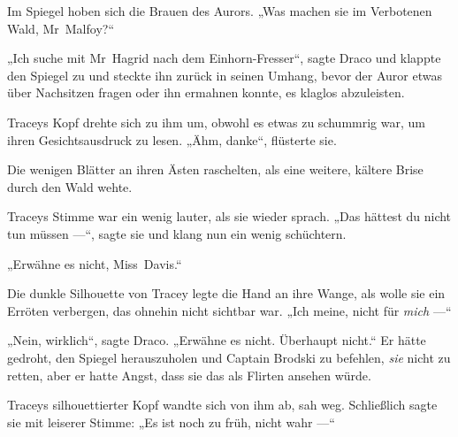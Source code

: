 Im Spiegel hoben sich die Brauen des Aurors.
„Was machen sie im Verbotenen Wald, Mr~Malfoy?“

„Ich suche mit Mr~Hagrid nach dem Einhorn-Fresser“, sagte Draco und klappte den Spiegel zu und steckte ihn zurück in seinen Umhang, bevor der Auror etwas über Nachsitzen fragen oder ihn ermahnen konnte, es klaglos abzuleisten.

Traceys Kopf drehte sich zu ihm um, obwohl es etwas zu schummrig war, um ihren Gesichtsausdruck zu lesen. „Ähm, danke“, flüsterte sie.

Die wenigen Blätter an ihren Ästen raschelten, als eine weitere, kältere Brise durch den Wald wehte.

Traceys Stimme war ein wenig lauter, als sie wieder sprach.
„Das hättest du nicht tun müssen —“, sagte sie und klang nun ein wenig schüchtern.

„Erwähne es nicht, Miss~Davis.“

Die dunkle Silhouette von Tracey legte die Hand an ihre Wange, als wolle sie ein Erröten verbergen, das ohnehin nicht sichtbar war.
„Ich meine, nicht für \emph{mich} —“

„Nein, wirklich“, sagte Draco.
„Erwähne es nicht. Überhaupt nicht.“
Er hätte gedroht, den Spiegel herauszuholen und Captain Brodski zu befehlen, \emph{sie} nicht zu retten, aber er hatte Angst, dass sie das als Flirten ansehen würde.

Traceys silhouettierter Kopf wandte sich von ihm ab, sah weg. Schließlich sagte sie mit leiserer Stimme:
„Es ist noch zu früh, nicht wahr —“

